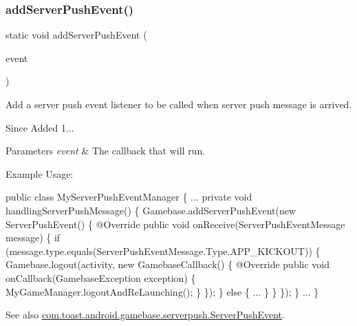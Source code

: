 \subsubsection{\texorpdfstring{add\+Server\+Push\+Event()}{addServerPushEvent()}}
{\footnotesize\ttfamily static void add\+Server\+Push\+Event (\begin{DoxyParamCaption}\item[{\hyperlink{interfacecom_1_1toast_1_1android_1_1gamebase_1_1serverpush_1_1_server_push_event}{Server\+Push\+Event}}]{event }\end{DoxyParamCaption})\hspace{0.3cm}{\ttfamily [static]}}



Add a server push event listener to be called when server push message is arrived. 

\begin{DoxySince}{Since}
Added 1... 
\end{DoxySince}

\begin{DoxyParams}{Parameters}
{\em event} & The callback that will run.\\
\hline
\end{DoxyParams}
Example Usage\+: 
\begin{DoxyCode}
\textcolor{keyword}{public} \textcolor{keyword}{class }MyServerPushEventManager \{
    ...
    \textcolor{keyword}{private} \textcolor{keywordtype}{void} handlingServerPushMessage() \{
        Gamebase.addServerPushEvent(\textcolor{keyword}{new} ServerPushEvent() \{
            @Override
            \textcolor{keyword}{public} \textcolor{keywordtype}{void} onReceive(ServerPushEventMessage message) \{
                \textcolor{keywordflow}{if} (message.type.equals(ServerPushEventMessage.Type.APP\_KICKOUT)) \{
                    Gamebase.logout(activity, \textcolor{keyword}{new} GamebaseCallback() \{
                        @Override
                        \textcolor{keyword}{public} \textcolor{keywordtype}{void} onCallback(GamebaseException exception) \{
                            MyGameManager.logoutAndReLaunching();
                        \}
                    \});
                \} \textcolor{keywordflow}{else} \{
                    ...
                \}
            \}
        \});
    \}
    ...
\}
\end{DoxyCode}


\begin{DoxySeeAlso}{See also}
\hyperlink{interfacecom_1_1toast_1_1android_1_1gamebase_1_1serverpush_1_1_server_push_event}{com.\+toast.\+android.\+gamebase.\+serverpush.\+Server\+Push\+Event}. 
\end{DoxySeeAlso}
\mbox{\label{classcom_1_1toast_1_1android_1_1gamebase_1_1_gamebase_a7415fdfef5db5d7e6b02e82f62927e9b}} 
